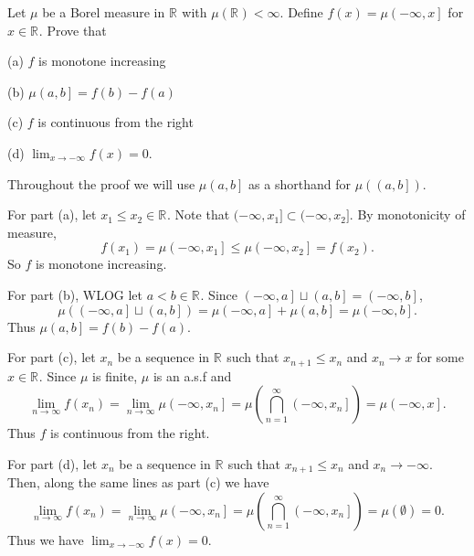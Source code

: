 
\begin{problem}{1}
  Let $\mu$ be a Borel measure in $\mathbb{R}^{}$ with $\mu\left( \mathbb{R}^{} \right) < \infty$.
  Define $f\left( x \right) = \mu\left( - \infty, x  \right]$ for $x \in \mathbb{R}^{}$.
  Prove that

  (a) $f$ is monotone increasing

  (b) $\mu \left( a,b \right] = f\left( b \right) - f\left( a \right)$

  (c) $f$ is continuous from the right

  (d) $\lim_{x \to -\infty} f\left( x  \right) = 0$.
\end{problem}

\begin{solution}
  Throughout the proof we will use $\mu\left( a,b \right]$ as a shorthand for $\mu\left( \left( a,b \right] \right)$.

  For part (a), let $x_{1} \leq x_{2} \in \mathbb{R}^{}$.
  Note that $(-\infty, x_{1}] \subset (-\infty, x_{2}]$.
  By monotonicity of measure,
  \[
    f\left( x_{1} \right) = \mu \left( -\infty, x_{1} \right] \leq \mu \left( -\infty, x_{2} \right] = f\left( x_{2} \right)
  .\] 
  So $f$ is monotone increasing.

  For part (b), WLOG let $a < b \in \mathbb{R}^{}$.
  Since $\left( -\infty, a \right] \sqcup \left( a,b \right] = \left( -\infty,b \right]$, 
  \[
    \mu \left( \left( -\infty, a \right] \sqcup \left( a,b \right] \right) = \mu \left( -\infty, a \right] + \mu \left( a,b \right] = \mu \left( -\infty, b \right]
  .\] 
  Thus $\mu\left( a,b \right] = f\left( b \right) - f\left( a \right)$.

  For part (c), let $x_{n}$ be a sequence in $\mathbb{R}^{}$ such that $x_{n+1} \leq x_{n}$ and $x_{n} \to x$ for some $x \in \mathbb{R}^{}$.
  Since $\mu$ is finite, $\mu$ is an a.s.f and 
  \[
    \lim_{n \to \infty} f\left( x_{n} \right) = \lim_{n \to \infty} \mu \left( -\infty, x_{n} \right] = \mu\left( \bigcap_{n=1}^{\infty}\left( -\infty,x_{n} \right] \right) = \mu\left( -\infty,x \right]
  .\] 
  Thus $f$ is continuous from the right.

  For part (d), let $x_{n}$ be a sequence in $\mathbb{R}^{}$ such that $x_{n+1} \leq x_{n}$ and $x_{n} \to -\infty$. 
  Then, along the same lines as part (c) we have 
  \[
    \lim_{n \to \infty} f\left( x_{n} \right) = \lim_{n \to \infty} \mu \left( -\infty, x_{n} \right] = \mu\left( \bigcap_{n=1}^{\infty}\left( -\infty,x_{n} \right] \right) = \mu\left( \emptyset \right) = 0
  .\]
  Thus we have $\lim_{x \to -\infty} f\left( x  \right) = 0$.
\end{solution}

